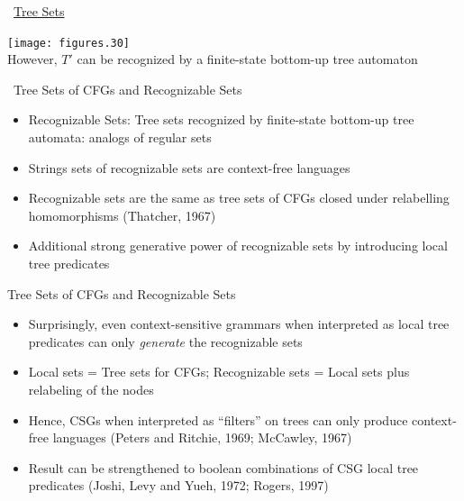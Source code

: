 \documentclass[landscape]{slides}
\def\dbend{{\manual\char127}}   %
\begin{document}
\begin{slide}{\dbend\ \underline{Tree Sets}}
\begin{center}
\texttt{[image: figures.30]}\\
However, $T'$ can be recognized by a finite-state bottom-up tree automaton
\end{center}
\end{slide}

\begin{slide}{\dbend\ Tree Sets of CFGs and Recognizable Sets}
\begin{itemize}
\item Recognizable Sets: Tree sets recognized by finite-state
  bottom-up tree automata: analogs of regular sets
\item Strings sets of recognizable sets are context-free languages
\item Recognizable sets are the same as tree sets of CFGs closed under
 relabelling homomorphisms (Thatcher, 1967)
\item Additional strong generative power of recognizable sets by
  introducing local tree predicates
\end{itemize}
\end{slide}


\begin{slide}{Tree Sets of CFGs and Recognizable Sets}
\begin{itemize}
\item Surprisingly, even context-sensitive grammars when interpreted
  as local tree predicates can only {\em generate} the recognizable
  sets
\item Local sets = Tree sets for CFGs; Recognizable sets = Local sets plus relabeling of the nodes
\item Hence, CSGs when interpreted as ``filters'' on trees can only
  produce context-free languages (Peters and Ritchie, 1969; McCawley,
  1967)
\item Result can be strengthened to boolean combinations of CSG local tree
  predicates (Joshi, Levy and Yueh, 1972; Rogers, 1997)
\end{itemize}
\end{slide}
\end{document}
